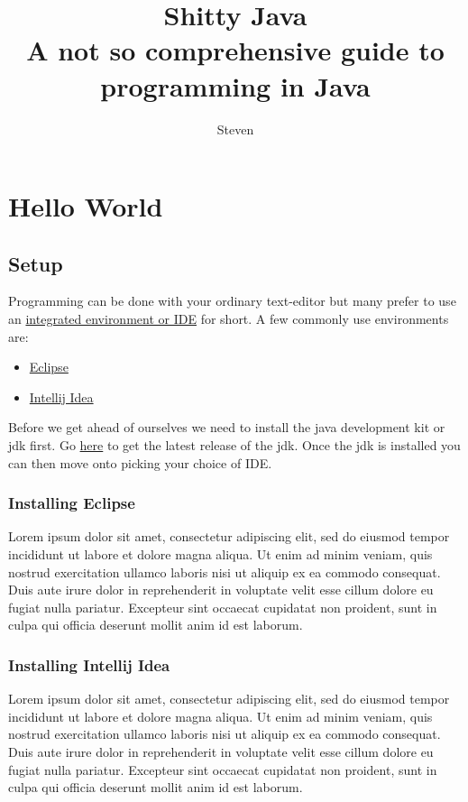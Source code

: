 \documentclass{article}
\title{Shitty Java \\ {\large A not so comprehensive guide to programming in Java}}
\author{Steven}
\begin{document}
\begin{titlepage}
	\maketitle
\end{titlepage}

\tableofcontents
\newpage

\section{Hello World}
\subsection{Setup}
Programming can be done with your ordinary text-editor but many prefer to use an
\href{https://wikipedia.org/wiki/Integrated_development_environment}{integrated environment or IDE} for short. A few commonly use environments are:
\begin{itemize}
	\item \href{https://www.eclipse.org/downloads/}{Eclipse}
	\item \href{https://www.jetbrains.com/idea/download/}{Intellij Idea}
\end{itemize}
Before we get ahead of ourselves we need to install the java development kit or jdk first. Go \href{https://www.oracle.com/technetwork/java/javase/downloads/index.html}{here} to get the latest release of the jdk. Once the jdk is installed you can then move onto picking your choice of IDE.

\subsubsection{Installing Eclipse}
Lorem ipsum dolor sit amet, consectetur adipiscing elit, sed do eiusmod tempor incididunt ut labore et dolore magna aliqua. Ut enim ad minim veniam, quis nostrud exercitation ullamco laboris nisi ut aliquip ex ea commodo consequat. Duis aute irure dolor in reprehenderit in voluptate velit esse cillum dolore eu fugiat nulla pariatur. Excepteur sint occaecat cupidatat non proident, sunt in culpa qui officia deserunt mollit anim id est laborum.


\subsubsection{Installing Intellij Idea}
Lorem ipsum dolor sit amet, consectetur adipiscing elit, sed do eiusmod tempor incididunt ut labore et dolore magna aliqua. Ut enim ad minim veniam, quis nostrud exercitation ullamco laboris nisi ut aliquip ex ea commodo consequat. Duis aute irure dolor in reprehenderit in voluptate velit esse cillum dolore eu fugiat nulla pariatur. Excepteur sint occaecat cupidatat non proident, sunt in culpa qui officia deserunt mollit anim id est laborum.
\end{document}
